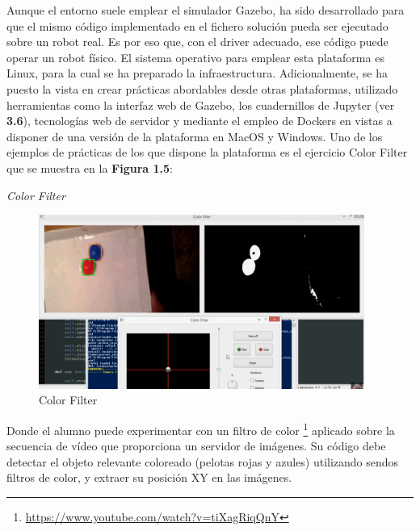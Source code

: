 Aunque el entorno suele emplear el simulador Gazebo, ha sido desarrollado para que el mismo código implementado en el fichero solución pueda ser ejecutado sobre un robot real. Es por eso que, con el driver adecuado, ese código puede operar un robot físico. El sistema operativo para emplear esta plataforma es Linux, para la cual se ha preparado la infraestructura. Adicionalmente, se ha puesto la vista en crear prácticas abordables desde otras plataformas, utilizado herramientas como la interfaz web de Gazebo, los cuadernillos de Jupyter (ver \textbf{3.6}), tecnologías web de servidor y mediante el empleo de Dockers en vistas a disponer de una versión de la plataforma en MacOS y Windows.
Uno de los ejemplos de prácticas de los que dispone la plataforma es el ejercicio Color Filter que se muestra en la \textbf{Figura 1.5}:

\hspace{0.4\linewidth}
\textit{Color Filter}

\begin{figure}[H]
  \begin{center}
    \includegraphics[width=0.95\textwidth]{figures/color_filter.png}
		\caption{Color Filter}
		\label{fig.colorfilter}
		\end{center}
\end{figure}

Donde el alumno puede experimentar con un filtro de color \footnote{\url{https://www.youtube.com/watch?v=tiXagRiqQnY}} aplicado sobre la secuencia de vídeo que proporciona un servidor de imágenes. Su código debe detectar el objeto relevante coloreado (pelotas rojas y azules) utilizando sendos filtros de color, y extraer su posición XY en las imágenes. 

